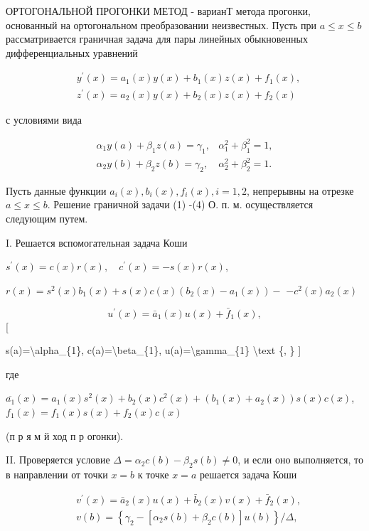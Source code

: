 \documentclass[10pt]{article}
\begin{document}
ОРТОГОНАЛЬНОЙ ПРОГОНКИ МЕТОД - варианТ метода прогонки, основанный на ортогональном преобразовании неизвестных. Пусть при $a \leqslant x \leqslant b$ рассматривается граничная задача для пары линейных обыкновенных дифференциальных уравнений

\[
\begin{aligned}
& y^{\prime}(x)=a_{1}(x) y(x)+b_{1}(x) z(x)+f_{1}(x), \\
& z^{\prime}(x)=a_{2}(x) y(x)+b_{2}(x) z(x)+f_{2}(x)
\end{aligned}
\]

с условиями вида

\[
\begin{array}{ll}
\alpha_{1} y(a)+\beta_{1} z(a)=\gamma_{1}, & \alpha_{1}^{2}+\beta_{1}^{2}=1, \\
\alpha_{2} y(b)+\beta_{2} z(b)=\gamma_{2}, & \alpha_{2}^{2}+\beta_{2}^{2}=1 .
\end{array}
\]

Пусть данные функции $a_{i}(x), b_{i}(x), f_{i}(x), i=1,2$, непрерывны на отрезке $a \leqslant x \leqslant b$. Решение граничной задачи (1) -(4) О. п. м. осуществляется следующим путем.

I. Решается вспомогательная задача Коши

$s^{\prime}(x)=c(x) r(x), \quad c^{\prime}(x)=-s(x) r(x)$,

$r(x)=s^{2}(x) b_{1}(x)+s(x) c(x)\left(b_{2}(x)-a_{1}(x)\right)-$ $-c^{2}(x) a_{2}(x)$

\[
u^{\prime}(x)=\bar{a}_{1}(x) u(x)+\bar{f}_{1}(x),
\][

s(a)=\textbackslash alpha\_\{1\}, c(a)=\textbackslash beta\_\{1\}, u(a)=\textbackslash gamma\_\{1\} \textbackslash text \{, \}
]

где

$\overline{a_{1}}(x)=a_{1}(x) s^{2}(x)+b_{2}(x) c^{2}(x)+\left(b_{1}(x)+a_{2}(x)\right) s(x) c(x)$, $f_{1}(x)=f_{1}(x) s(x)+f_{2}(x) c(x)$

(п р я м й ход п р огонки).

II. Проверяется условие $\Delta=\alpha_{2} c(b)-\beta_{2} s(b) \neq 0$, и если оно выполняется, то в направлении от точки $x=b$ к точке $x=a$ решается задача Коши

\[
\begin{aligned}
& v^{\prime}(x)=\bar{a}_{2}(x) u(x)+\bar{b}_{2}(x) v(x)+\bar{f}_{2}(x), \\
& v(b)=\left\{\gamma_{2}-\left[\alpha_{2} s(b)+\beta_{2} c(b)\right] u(b)\right\} / \Delta,
\end{aligned}
\]
\end{document}
